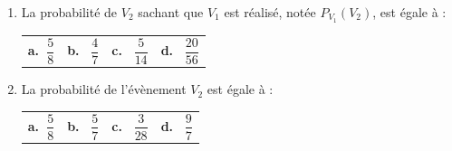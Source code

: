 \documentclass[10pt]{article}
\begin{document}
\begin{enumerate}[resume]
\item  La probabilité de $V_2$ sachant que $V_1$ est réalisé, notée $P_{V_1}\left(V_2\right)$, est égale à :
\begin{center}
\begin{tabularx}{\linewidth}{*{4}{X}}
\textbf{a.~}$\dfrac{5}{8}$&\textbf{b.~} $\dfrac{4}{7}$&\textbf{c.~} $\dfrac{5}{14}$&\textbf{d.~}
$\dfrac{20}{56}$ 
\end{tabularx}
\end{center}
\item La probabilité de l'évènement $V_2$ est égale à :
\begin{center}
\begin{tabularx}{\linewidth}{*{4}{X}}
\textbf{a.~}$\dfrac{5}{8}$&\textbf{b.~} $\dfrac{5}{7}$&\textbf{c.~} $\dfrac{3}{28}$&\textbf{d.~}
$\dfrac{9}{7}$ 
\end{tabularx}
\end{center}
\end{enumerate}

\bigskip
\end{document}
